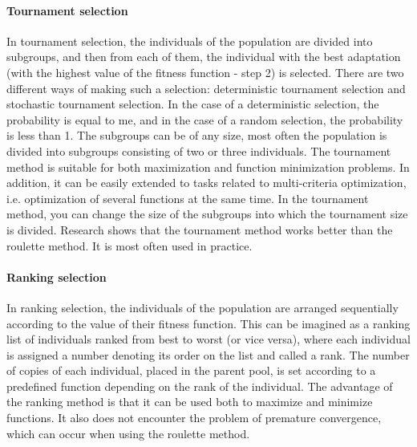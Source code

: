 \paragraph{Tournament selection}

In tournament selection, the individuals of the population are divided into subgroups, 
and then from each of them, the individual with the best adaptation (with the highest 
value of the fitness function - step 2) is selected. 
There are two different ways of making such a selection: deterministic tournament
selection and stochastic tournament selection. In the case of a deterministic 
selection, the probability is equal to me, and in the case of a random selection, 
the probability is less than 1. 
The subgroups can be of any size, most often the population is divided into subgroups 
consisting of two or three individuals. The tournament method is suitable for both 
maximization and function minimization problems. In addition, it can be easily 
extended to tasks related to multi-criteria optimization, i.e. optimization of several 
functions at the same time. 
In the tournament method, you can change the size of the subgroups into which the 
tournament size is divided. 
Research shows that the tournament method works better than the roulette method. 
It is most often used in practice.

\paragraph{Ranking selection} 
In ranking selection, the individuals of the population are arranged 
sequentially according to the value of their fitness function. 
This can be imagined as a ranking list of individuals ranked from best to worst 
(or vice versa), where each individual is assigned a number denoting its order on 
the list and called a rank. 
The number of copies of each individual, placed in the parent pool, is set 
according to a predefined function depending on the rank of the individual. 
The advantage of the ranking method is that it can be used both to maximize and 
minimize functions. It also does not encounter the problem of premature convergence, 
which can occur when using the roulette method.

